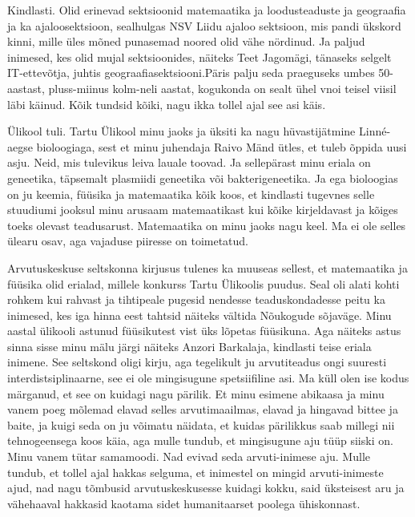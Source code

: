 
Kindlasti.  Olid erinevad sektsioonid matemaatika ja loodusteaduste ja 
geograafia ja ka ajaloosektsioon, sealhulgas NSV Liidu ajaloo sektsioon, mis 
pandi ükskord kinni, mille üles mõned punasemad noored olid vähe nördinud. Ja 
paljud inimesed, kes olid mujal sektsioonides, näiteks Teet 
Jagomägi, tänaseks selgelt IT-ettevõtja, juhtis 
geograafiasektsiooni.Päris palju seda praeguseks umbes 50-aastast, pluss-miinus 
kolm-neli aastat, kogukonda on sealt ühel vnoi teisel viisil läbi käinud. Kõik 
tundsid kõiki, nagu ikka tollel ajal see asi käis.


Ülikool tuli. Tartu Ülikool minu jaoks ja  üksiti ka nagu hüvastijätmine 
Linné-aegse bioloogiaga, sest et minu juhendaja Raivo Mänd ütles, et tuleb õppida uusi asju. Neid, mis  tulevikus leiva lauale 
toovad. Ja sellepärast minu eriala on geneetika, täpsemalt plasmiidi geneetika 
või bakterigeneetika. Ja ega  bioloogias on ju keemia, füüsika ja matemaatika 
kõik koos, et kindlasti tugevnes selle stuudiumi jooksul minu arusaam 
matemaatikast kui  kõike kirjeldavast ja kõiges toeks olevast teadusarust. 
Matemaatika on minu jaoks nagu keel. Ma ei ole selles ülearu osav, aga vajaduse 
piiresse on toimetatud.


Arvutuskeskuse seltskonna kirjusus tulenes ka muuseas sellest, et matemaatika 
ja füüsika olid erialad, millele konkurss Tartu Ülikoolis puudus. Seal oli 
alati kohti rohkem kui rahvast ja tihtipeale pugesid nendesse teaduskondadesse 
peitu ka inimesed, kes iga hinna eest tahtsid näiteks vältida Nõukogude 
sõjaväge. Minu aastal ülikooli astunud füüsikutest vist üks lõpetas füüsikuna. 
Aga näiteks astus sinna sisse minu mälu järgi näiteks Anzori 
Barkalaja, kindlasti teise eriala inimene. See 
seltskond oligi kirju, aga tegelikult ju arvutiteadus ongi suuresti 
interdistsiplinaarne, see ei ole mingisugune spetsiifiline asi. Ma küll olen 
ise kodus märganud, et see on kuidagi nagu pärilik. Et  minu esimene abikaasa 
ja minu vanem poeg mõlemad elavad selles arvutimaailmas, elavad ja hingavad 
bittee ja baite, ja kuigi seda on ju võimatu näidata, et kuidas pärilikkus saab 
millegi nii tehnogeensega koos käia, aga mulle tundub, et mingisugune aju tüüp 
siiski on. Minu vanem tütar samamoodi. Nad evivad seda arvuti-inimese aju. 
Mulle tundub, et tollel ajal hakkas selguma, et inimestel on mingid 
arvuti-inimeste ajud, nad nagu tõmbusid arvutuskeskusesse kuidagi kokku, said 
üksteisest aru ja vähehaaval hakkasid kaotama sidet humanitaarset poolega 
ühiskonnast.

